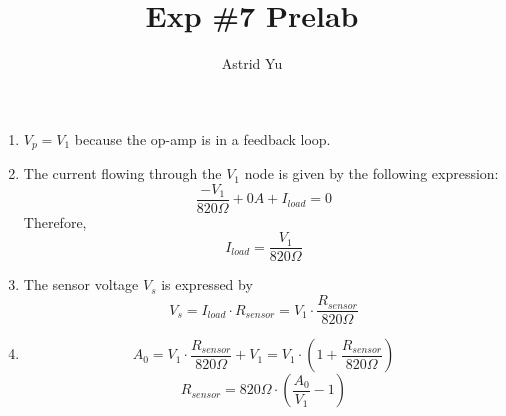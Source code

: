 \documentclass[12pt]{article}
\author{Astrid Yu}
\title{Exp \#7 Prelab}
\begin{document}
\maketitle

\begin{enumerate}
    \item $V_p = V_1$ because the op-amp is in a feedback loop. 
    
    \item The current flowing through the $V_1$ node is given by the following expression:
    $$\frac{-V_1}{820\Omega} + 0A + I_{load} = 0$$
    Therefore, 
    $$I_{load} = \frac{V_1}{820\Omega}$$
    
    \item The sensor voltage $V_s$ is expressed by
    $$V_s = I_{load}\cdot R_{sensor} = V_1 \cdot \frac{R_{sensor}}{820\Omega}$$
    
    \item $$A_0 = V_1 \cdot \frac{R_{sensor}}{820\Omega} + V_1 = V_1 \cdot \left(1 + \frac{R_{sensor}}{820\Omega}\right)$$
    $$R_{sensor} = 820\Omega\cdot\left(\frac{A_0}{V_1} - 1\right)$$

\end{enumerate}
\end{document}
